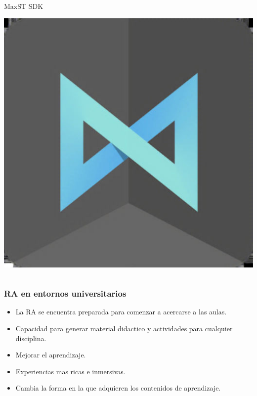 \begin{frame}
\begin{columns}
			\begin{column}{0.3\textwidth}
				\begin{center}
					MaxST SDK
				\end{center}
				\vspace{3mm}
				\vfill 
					\begin{center}
						\includegraphics[width=0.5\linewidth]{Images/maxst}
					\end{center}
			\end{column}
		\end{columns}
	\endblock{}
\end{frame}




\begin{frame}
	\frametitle{RA en entornos universitarios}
				\begin{itemize}
					\item La RA se encuentra preparada para comenzar a acercarse a las aulas.
					\item Capacidad para generar material didactico y actividades para cualquier disciplina.
					\item Mejorar el aprendizaje.
					\item Experiencias mas ricas e inmersivas.
					\item Cambia la forma en la que adquieren los contenidos de aprendizaje.
				\end{itemize}
			\endblock{}
\end{frame}


			
